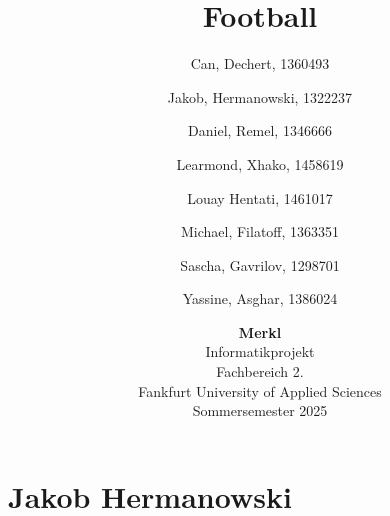 \documentclass[12pt]{article}
\author{
	Can, Dechert, 1360493\\
	\and
	Jakob, Hermanowski, 1322237\\
	\and
	Daniel, Remel, 1346666\\
	\and
	Learmond, Xhako, 1458619\\
	\and
	Louay Hentati, 1461017\\
	\and
	Michael, Filatoff, 1363351\\
	\and
	Sascha, Gavrilov, 1298701\\
	\and
	Yassine, Asghar, 1386024\\
}
\title{Football}
\date{\vspace{0.5cm}
	\textbf{Merkl}
	\vspace{0.5cm} \\
	Informatikprojekt
	\vspace{0.5cm}\\
	Fachbereich 2.
	\vspace{0.5cm}\\
	Fankfurt University of Applied Sciences
	\vspace{0.5cm} \\
	Sommersemester 2025}
\begin{document}
\maketitle
\pagebreak
\tableofcontents
\pagebreak
\section{Jakob Hermanowski}

\end{document}
